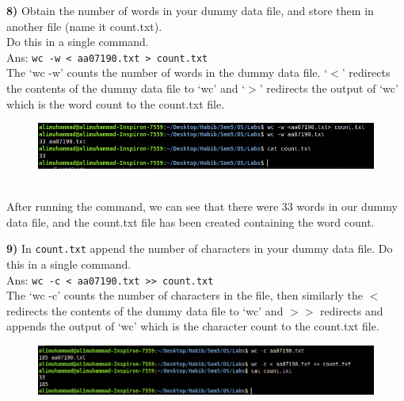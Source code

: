 \documentclass{article}
\theoremstyle{mytheoremstyle}
\theoremstyle{mytheoremstyle}
\theoremstyle{myproblemstyle}
\begin{document}
\vspace*{10mm}
\textbf{8)} Obtain the number of words in your dummy data file, and store them in another file (name it count.txt). \\ Do this in a single command. \\
Ans: \texttt{wc -w < aa07190.txt > count.txt} \\
The `wc -w' counts the number of words in the dummy data file. `$<$' redirects the contents of the dummy data file to `wc' and `$>$' redirects the output of `wc' which is the word count to the count.txt file.
\begin{figure}[htbp]
    \includegraphics[width=1.0\textwidth]{lab2_8.png}
\end{figure} \\
After running the command, we can see that there were 33 words in our dummy data file, and the count.txt file has been created containing the word count.

\vspace*{10mm}
\textbf{9)} In \texttt{count.txt} append the number of characters in your dummy data file. Do this in a single command. \\
Ans: \texttt{wc -c < aa07190.txt >> count.txt} \\
The `wc -c' counts the number of characters in the file, then similarly the $<$ redirects the contents of the dummy data file to `wc' and $>>$ redirects and appends the output of `wc' which is the character count to the count.txt file.
\begin{figure}[htbp]
    \includegraphics[width=1.0\textwidth]{lab2_9.png}
\end{figure}
\end{document}
